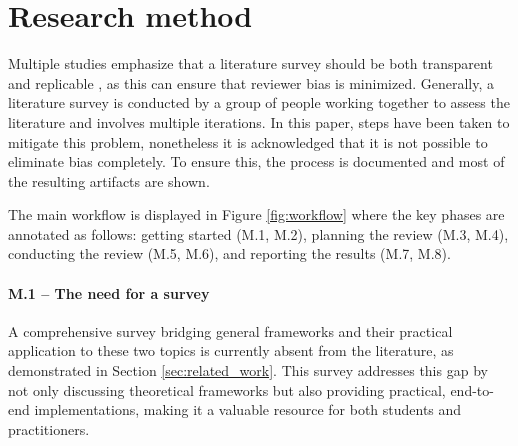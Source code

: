 

\section{Research method}
\label{sec:protocol}

Multiple studies emphasize that a literature survey should be both transparent and replicable
\cite{keele_systematic_2007, dos_santos_sustainable_2024-1}, as this can ensure that reviewer bias
is minimized. Generally, a literature survey is conducted by a group of people working together to
assess the literature and involves multiple iterations. In this paper, steps have been taken to
mitigate this problem, nonetheless it is acknowledged that it is not possible to eliminate bias
completely. To ensure this, the process is documented and most of the resulting artifacts are
shown.


The main workflow is displayed in Figure \ref{fig:workflow} where the key phases are annotated as
follows: getting started (M.1, M.2), planning the review (M.3, M.4), conducting the review (M.5,
M.6), and reporting the results (M.7, M.8).

\paragraph{M.1 -- The need for a survey}
\label{sec:need_for_survey}
A comprehensive survey bridging general frameworks and their practical application to these two
topics is currently absent from the literature, as demonstrated in Section \ref{sec:related_work}.
This survey addresses this gap by not only discussing theoretical frameworks but also providing
practical, end-to-end implementations, making it a valuable resource for both students and
practitioners.

